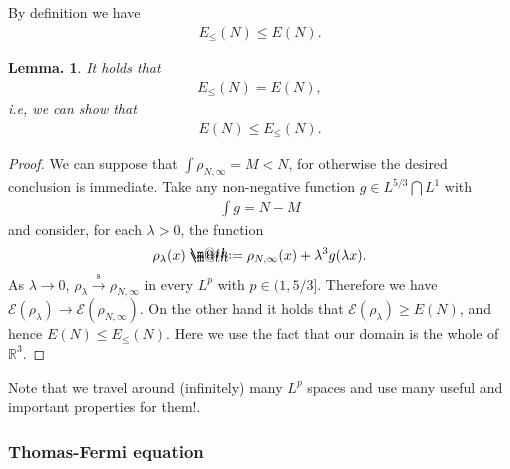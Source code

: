 \documentclass[openany, a4paper, oneside]{jsbook}
\makeatletter
\newcommand*{\defeq}{\mathrel{\rlap{%
\raisebox{0.3ex}{$\m@th\cdot$}}%
\raisebox{-0.3ex}{$\m@th\cdot$}}%
=}
\theoremstyle{break}
\theoremstyle{breakdefn}
\newtheorem{lem}[thm]{Lemma.}
\newcommand{\bbRthree}{\mathbb{R}^3}
\newcommand{\calE}{\mathcal{E}}
\newcommand{\EleqN}{E_{\leq}(N)}
\newcommand{\rhoNinfty}{\rho_{N, \infty}}
\newcommand{\sto}{\xrightarrow{\text{s}}}
\makeatother
\begin{document}
By definition we have
\begin{align}
 \EleqN
 \leq
 E (N).
\end{align}
\begin{lem}
 It holds that
 \begin{align}
  \EleqN = E (N),
 \end{align}
 i.e, we can show that
 \begin{align}
  E (N) \leq \EleqN.
 \end{align}
\end{lem}
\begin{proof}
We can suppose that $\int \rhoNinfty = M < N$, for otherwise the desired conclusion is immediate.
Take any non-negative function $g \in L^{5/3} \bigcap L^{1}$ with
\begin{align}
 \int g = N - M
\end{align}
and consider, for each $\lambda > 0$, the function
\begin{align}
 \rho_{\lambda} (x)
 \defeq
 \rhoNinfty (x) + \lambda^3 g (\lambda x).
\end{align}
As $\lambda \to 0$, $\rho_{\lambda} \sto \rhoNinfty$ in every $L^p$ with $p \in (1, 5/3]$.
Therefore we have $\calE (\rho_{\lambda}) \to \calE (\rhoNinfty)$.
On the other hand it holds that $\calE (\rho_{\lambda}) \geq E (N)$,
and hence $E (N) \leq \EleqN$.
Here we use the fact that our domain is the whole of $\bbRthree$.
\end{proof}

Note that we travel around (infinitely) many $L^p$ spaces and use many useful and important properties for them!.
\subsubsection{Thomas-Fermi equation}
\end{document}
